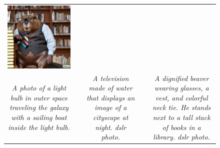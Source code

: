 \begin{figure}[ht!]
\begin{adjustwidth}{-0.8in}{-0.5in}
\begin{tabular}{cccccccccccccccccccc}
\multicolumn{6}{c}{\includegraphics[width=\thirdcolwidth\textwidth]{figures/cherries/beaver_librarian.jpg}} \\
\multicolumn{6}{p{\thirdcolwidth\textwidth}}{\textit{\tiny A photo of a light bulb in outer space traveling the galaxy with a sailing boat inside the light bulb.}} && 
\multicolumn{6}{p{\thirdcolwidth\textwidth}}{\textit{\tiny A television made of water that displays an image of a cityscape at night. dslr photo.}} && 
\multicolumn{6}{p{\thirdcolwidth\textwidth}}{\textit{\tiny A dignified beaver wearing glasses, a vest, and colorful neck tie. He stands next to a tall stack of books in a library. dslr photo.}} \\


\end{tabular}
\end{adjustwidth}
\end{figure}

